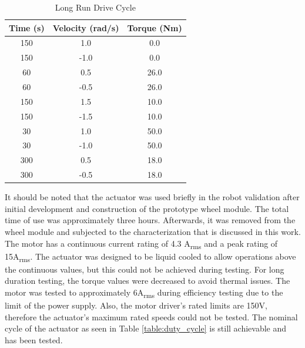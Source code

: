 \begin{table}[h]
  \vskip0.2cm
  \caption{Long Run Drive Cycle}
  \label{table:long_run}
  \begin{center}
    \vskip-0.2cm
    \begin{tabular}{|c||c||c|}
    \hline
    Time (s) & Velocity (rad/s) & Torque (Nm)\\
    \hline
    150 & 1.0 & 0.0\\
    \hline
    150 & -1.0 & 0.0\\
    \hline
    60 & 0.5 & 26.0\\
    \hline
    60 & -0.5 & 26.0\\
    \hline
    150 & 1.5 & 10.0\\
    \hline
    150 & -1.5 & 10.0\\
    \hline
    30 & 1.0 & 50.0\\
    \hline
    30 & -1.0 & 50.0\\
    \hline
    300 & 0.5 & 18.0\\
    \hline
    300 & -0.5 & 18.0\\
    \hline
    \end{tabular}
  \end{center}
\end{table}

It should be noted that the actuator was used briefly in the robot validation after initial development and construction of the prototype wheel module.
The total time of use was approximately three hours.
Afterwards, it was removed from the wheel module and subjected to the characterization that is discussed in this work.
The motor has a continuous current rating of 4.3 A\textsubscript{rms} and a peak rating of 15A\textsubscript{rms}.
The actuator was designed to be liquid cooled to allow operations above the continuous values, but this could not be achieved during testing.
For long duration testing, the torque values were decreased to avoid thermal issues.
The motor was tested to approximately 6A\textsubscript{rms} during efficiency testing due to the limit of the power supply.
Also, the motor driver's rated limits are 150V, therefore the actuator's maximum rated speeds could not be tested.
The nominal cycle of the actuator as seen in Table \ref{table:duty_cycle} is still achievable and has been tested.



